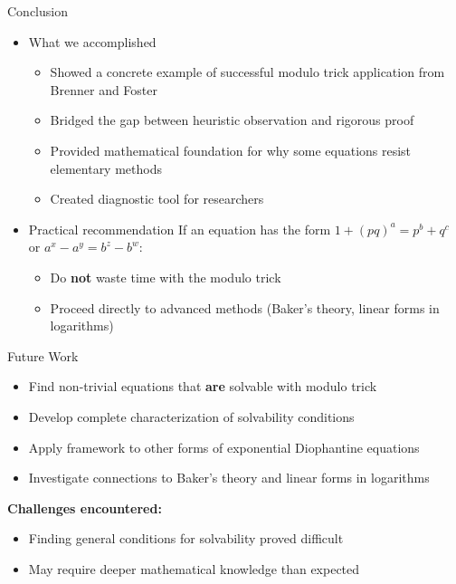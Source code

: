 ﻿\documentclass[10pt,aspectratio=169]{beamer}
\begin{document}
\begin{frame}{Conclusion}
\begin{itemize}
    \item[] \begin{block}{What we accomplished}
        \begin{itemize}
            \item Showed a concrete example of successful modulo trick application from Brenner and Foster
            \item Bridged the gap between heuristic observation and rigorous proof
            \item Provided mathematical foundation for why some equations resist elementary methods
            \item Created diagnostic tool for researchers
        \end{itemize}
    \end{block}
    
    \item[] \begin{block}{Practical recommendation}
        If an equation has the form $1+(pq)^a = p^b+q^c$ or $a^x-a^y = b^z-b^w$:
        \begin{itemize}
            \item Do \textbf{not} waste time with the modulo trick
            \item Proceed directly to advanced methods (Baker's theory, linear forms in logarithms)
        \end{itemize}
    \end{block}
\end{itemize}

\end{frame}

\begin{frame}{Future Work}
    \begin{itemize}
        \item Find non-trivial equations that \textbf{are} solvable with modulo trick
        \item Develop complete characterization of solvability conditions
        \item Apply framework to other forms of exponential Diophantine equations
        \item Investigate connections to Baker's theory and linear forms in logarithms
    \end{itemize}
    
    \vspace{0.5cm}
    \textbf{Challenges encountered:}
    \begin{itemize}
        \item Finding general conditions for solvability proved difficult
        \item May require deeper mathematical knowledge than expected
    \end{itemize}
\end{frame}
\end{document}
